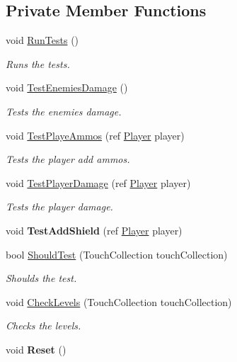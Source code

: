 \subsection*{Private Member Functions}
\begin{DoxyCompactItemize}
\item 
void \hyperlink{classXaria_1_1Test_ad254f5685477c88d63b0a0ebd0ae81de}{Run\+Tests} ()
\begin{DoxyCompactList}\small\item\em Runs the tests. \end{DoxyCompactList}\item 
void \hyperlink{classXaria_1_1Test_ad17445853f03cb253110d639dd87dcf2}{Test\+Enemies\+Damage} ()
\begin{DoxyCompactList}\small\item\em Tests the enemies damage. \end{DoxyCompactList}\item 
void \hyperlink{classXaria_1_1Test_a33f6befa401ec79a76fee327f2632a3a}{Test\+Playe\+Ammos} (ref \hyperlink{classXaria_1_1Player}{Player} player)
\begin{DoxyCompactList}\small\item\em Tests the player add ammos. \end{DoxyCompactList}\item 
void \hyperlink{classXaria_1_1Test_a459546edfae1ef2d205103128e46593c}{Test\+Player\+Damage} (ref \hyperlink{classXaria_1_1Player}{Player} player)
\begin{DoxyCompactList}\small\item\em Tests the player damage. \end{DoxyCompactList}\item 
\mbox{\label{classXaria_1_1Test_a6243e5622832b94ae1f35a3d57799b72}} 
void {\bfseries Test\+Add\+Shield} (ref \hyperlink{classXaria_1_1Player}{Player} player)
\item 
bool \hyperlink{classXaria_1_1Test_a9eff33d099d4327f6215d8ff34adbdb8}{Should\+Test} (Touch\+Collection touch\+Collection)
\begin{DoxyCompactList}\small\item\em Shoulds the test. \end{DoxyCompactList}\item 
void \hyperlink{classXaria_1_1Test_a510dbeecb286790088a62c01883875a9}{Check\+Levels} (Touch\+Collection touch\+Collection)
\begin{DoxyCompactList}\small\item\em Checks the levels. \end{DoxyCompactList}\item 
\mbox{\label{classXaria_1_1Test_a6f568c77d351094c36a9d7841e79ded5}} 
void {\bfseries Reset} ()
\end{DoxyCompactItemize}
